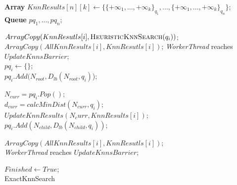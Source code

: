 \small
\begin{algorithm}
	\DontPrintSemicolon
	\vspace{.2cm}
	\textbf{Array} $KnnResults[n][k] \gets \{\{+\infty_{1}, ..., +\infty_{k}\}_{q_{1}}, ..., \{+\infty_{1}, ..., +\infty_{k}\}_{q_{n}}\}$;\\
	\textbf{Queue} $pq_{1}, ..., pq_{n}$;\\
	\vspace{.2cm}
	
	{%
		$ArrayCopy(KnnResutls[i], \text{\sc HeuristicKnnSearch} (q_{i}))$;\\
		$ArrayCopy(AllKnnResults[i], KnnResutls[i])$;
	}
 	{\it WorkerThread} reaches $UpdateKnnsBarrier$; \\
 	
 	{
 		$pq_i \gets \{\}$;\\
 		$pq_i.Add(N_{root},D_{lb}(N_{root}, q_i)$);\\
 	}
 
 	{
 		{
 			$N_{curr} = pq_{i}.Pop()$;\\
 			{
 				$d_{curr} = calcMinDist(N_{curr}, q_{i})$;\\
 				{
 					$UpdateKnnResults(N_curr, KnnResults[i])$;\\
 				}
 			}
 			\Else
 			{
 				{
 					{
 						$pq_i.Add(N_{child},D_{lb}(N_{child}, q_i))$;\\	
 					}	
 				}
 			}
 		}

 		{
 			$ArrayCopy(AllKnnResults[i], KnnResutls[i])$;\\	
 		}
 	 	{\it WorkerThread} reaches $UpdateKnnsBarrier$; \\
 	}
 	$Finished \gets True$;\\
	\caption{{\sc ExactKnnSearch}}
	\label{algo:exact_knn_search}
\end{algorithm}

